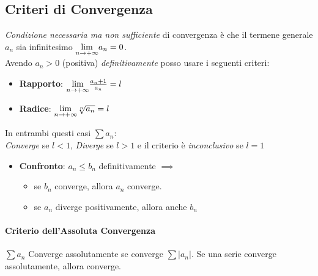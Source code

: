\documentclass[12pt, a4paper, openany]{article}
\begin{document}
	\subsection*{Criteri di Convergenza}

	\emph{Condizione necessaria ma non sufficiente} di convergenza è che il termene generale $a_n$ sia infinitesimo $\underset{n \to +\infty}{\lim} a_n = 0$.
	\\Avendo $a_n>0$ (positiva) \emph{definitivamente} posso usare i seguenti criteri:
	\begin{itemize}
		\item \textbf{Rapporto}: $\underset{n \to +\infty}{\lim} \frac{a_n+1}{a_n} = l$
		\item \textbf{Radice}: $\underset{n \to +\infty}{\lim} \sqrt[n]{a_n} = l$
	\end{itemize}
	In entrambi questi casi $\sum a_n$:\\
	\emph{Converge} se $l<1$, \emph{Diverge} se $l>1$ e il criterio è \emph{inconclusivo} se $l=1$

	\begin{itemize}
		\item \textbf{Confronto}: $a_n\leq b_n$ definitivamente $\implies$
		\begin{itemize}
			\item se $b_n$ converge, allora $a_n$ converge.
			\item se $a_n$ diverge positivamente, allora anche $b_n$
		\end{itemize}
	\end{itemize}

	\paragraph*{Criterio dell'Assoluta Convergenza}
	$\sum a_n$ Converge assolutamente se converge $\sum |a_n|$.
	Se una serie converge assolutamente, allora converge.
\end{document}
